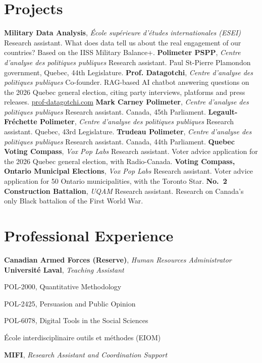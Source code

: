 \documentclass[10pt,letterpaper]{article}
\begin{document}
\section*{Projects}
  {\textbf{Military Data Analysis}, \textit{École supérieure d'études internationales (ESEI)}}
  {Research assistant. What does data tell us about the real engagement of our countries?
   Based on the IISS Military Balance+.}
  {\textbf{Polimeter PSPP}, \textit{Centre d'analyse des politiques publiques}}
  {Research assistant. Paul St-Pierre Plamondon government, Quebec, 44th Legislature.}
  {\textbf{Prof. Datagotchi}, \textit{Centre d'analyse des politiques publiques}}
  {Co-founder. RAG-based AI chatbot answering questions on the 2026 Quebec general election, citing party
   interviews, platforms and press releases. \href{https://prof-datagotchi.com/}{prof-datagotchi.com}}
  {\textbf{Mark Carney Polimeter}, \textit{Centre d'analyse des politiques publiques}}
  {Research assistant. Canada, 45th Parliament.}
  {\textbf{Legault-Fréchette Polimeter}, \textit{Centre d'analyse des politiques publiques}}
  {Research assistant. Quebec, 43rd Legislature.}
  {\textbf{Trudeau Polimeter}, \textit{Centre d'analyse des politiques publiques}}
  {Research assistant. Canada, 44th Parliament.}
  {\textbf{Quebec Voting Compass}, \textit{Vox Pop Labs}}
  {Research assistant. Voter advice application for the 2026 Quebec general election, with Radio-Canada.}
  {\textbf{Voting Compass, Ontario Municipal Elections}, \textit{Vox Pop Labs}}
  {Research assistant. Voter advice application for 50 Ontario municipalities, with the Toronto Star.}
  {\textbf{No.\ 2 Construction Battalion}, \textit{UQAM}}
  {Research assistant. Research on Canada's only Black battalion of the First World War.}

\section*{Professional Experience}
  {\textbf{Canadian Armed Forces (Reserve)}, \textit{Human Resources Administrator}}{}
  {\textbf{Université Laval}, \textit{Teaching Assistant}}{}
\begin{cvitems}
\item POL-2000, Quantitative Methodology
\item POL-2425, Persuasion and Public Opinion
\item POL-6078, Digital Tools in the Social Sciences
\item École interdisciplinaire outils et méthodes (EIOM)
\end{cvitems}
  {\textbf{MIFI}, \textit{Research Assistant and Coordination Support}}{}
\end{document}

